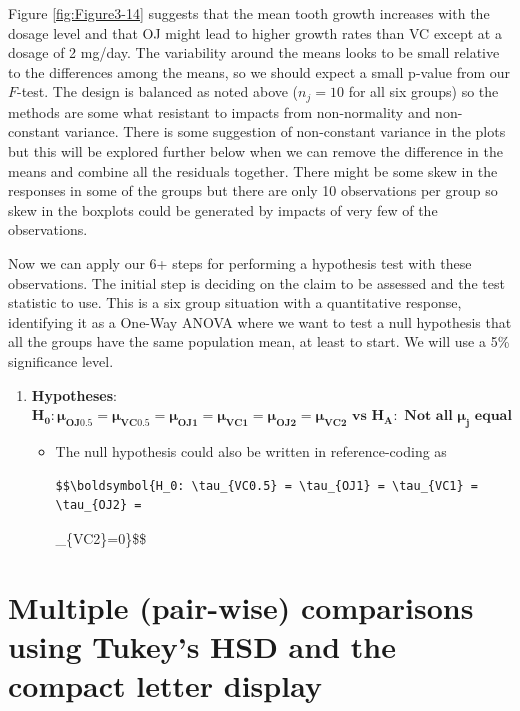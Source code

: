 \documentclass[]{book}
\begin{document}
Figure \ref{fig:Figure3-14} suggests that the mean tooth growth
increases with the dosage level and that OJ might lead to higher growth
rates than VC except at a dosage of 2 mg/day. The variability around the
means looks to be small relative to the differences among the means, so
we should expect a small p-value from our \(F\)-test. The design is
balanced as noted above (\(n_j=10\) for all six groups) so the methods
are some what resistant to impacts from non-normality and non-constant
variance. There is some suggestion of non-constant variance in the plots
but this will be explored further below when we can remove the
difference in the means and combine all the residuals together. There
might be some skew in the responses in some of the groups but there are
only 10 observations per group so skew in the boxplots could be
generated by impacts of very few of the observations.

Now we can apply our 6+ steps for performing a hypothesis test with
these observations. The initial step is deciding on the claim to be
assessed and the test statistic to use. This is a six group situation
with a quantitative response, identifying it as a One-Way ANOVA where we
want to test a null hypothesis that all the groups have the same
population mean, at least to start. We will use a 5\% significance
level.

\begin{enumerate}
\def\labelenumi{\arabic{enumi}.}
\item
  \textbf{Hypotheses}:
  \(\boldsymbol{H_0: \mu_{OJ0.5} = \mu_{VC0.5} = \mu_{OJ1} = \mu_{VC1} = \mu_{OJ2} = \mu_{VC2}} \textbf{ vs } \boldsymbol{H_A:} \textbf{ Not all } \boldsymbol{\mu_j} \textbf{ equal}\)

  \begin{itemize}
  \item
    The null hypothesis could also be written in reference-coding as

\begin{verbatim}
$$\boldsymbol{H_0: \tau_{VC0.5} = \tau_{OJ1} = \tau_{VC1} = \tau_{OJ2} = 
\end{verbatim}

    \tau\_\{VC2\}=0\}\$\$
  \end{itemize}
\end{enumerate}

\section{Multiple (pair-wise) comparisons using Tukey's HSD and the
compact letter display}\label{section3-6}
\end{document}
